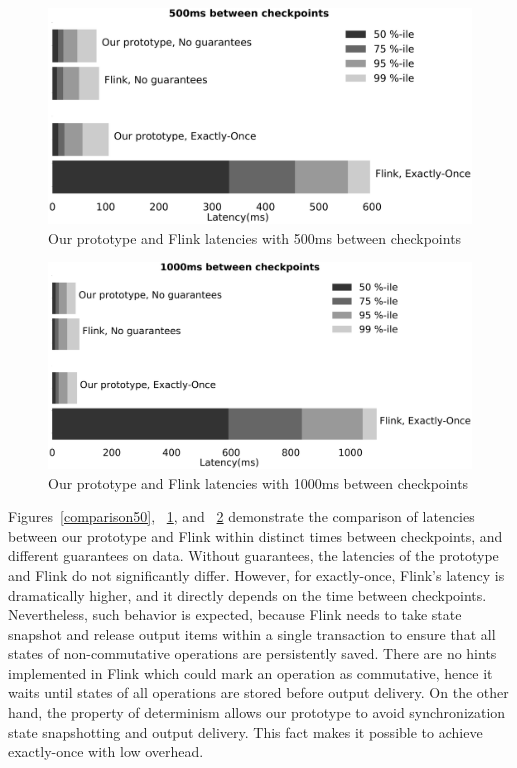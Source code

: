 \begin{figure}[htbp]
  \centering
  \includegraphics[width=.48\textwidth]{pics/comparison500}
  \caption{Our prototype and Flink latencies with 500ms between checkpoints}
  \label{comparison500}
\end{figure}

\begin{figure}[htbp]
  \centering
  \includegraphics[width=.48\textwidth]{pics/comparison1000}
  \caption{Our prototype and Flink latencies with 1000ms between checkpoints}
  \label{comparison1000}
\end{figure}

Figures~\ref{comparison50}, ~\ref{comparison500}, and ~\ref{comparison1000} demonstrate      the comparison of latencies between our prototype and Flink within distinct times between checkpoints, and different guarantees on data. Without guarantees, the latencies of the prototype and Flink do not significantly differ. However, for exactly-once, Flink's latency is dramatically higher, and it directly depends on the time between checkpoints. Nevertheless, such behavior is expected, because Flink needs to take state snapshot and release output items within a single transaction to ensure that all states of non-commutative operations are persistently saved. There are no hints implemented in Flink which could mark an operation as commutative, hence it waits until states of all operations are stored before output delivery. 
On the other hand, the property of determinism allows our prototype to avoid synchronization state snapshotting and output delivery. This fact makes it possible to achieve exactly-once with low overhead.
